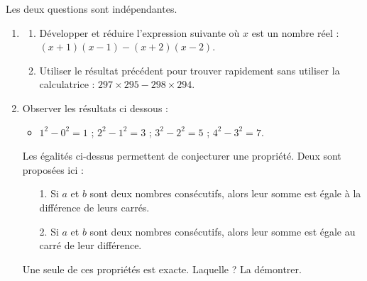 \bigskip


\begin{exercice}[CRPE 2009 G1] %
   Les deux questions sont indépendantes.
   \begin{enumerate}
      \item
      \begin{enumerate}
         \item Développer et réduire l'expression suivante où $x$ est un nombre réel : $(x+1)(x-1)-(x+2)(x-2)$.
         \item Utiliser le résultat précédent pour trouver rapidement sans utiliser la calculatrice : $297\times295-298\times294$.
      \end{enumerate}
      \item Observer les résultats ci dessous :
      \begin{itemize}
         \item $1^2-0^2=1$ \qquad ; \qquad $2^2-1^2=3$ \qquad ; \qquad $3^2-2^2=5$ \qquad ; \qquad $4^2-3^2=7$.
      \end{itemize}
      Les égalités ci-dessus permettent de conjecturer une propriété. Deux sont proposées ici :
      \begin{enumerate}
         \item[1.] Si $a$ et $b$ sont deux nombres consécutifs, alors leur somme est égale à la différence de leurs carrés.
         \item[2.] Si $a$ et $b$ sont deux nombres consécutifs, alors leur somme est égale au carré de leur différence.
      \end{enumerate}
      Une seule de ces propriétés est exacte. Laquelle ? La démontrer.
   \end{enumerate}
\end{exercice}

